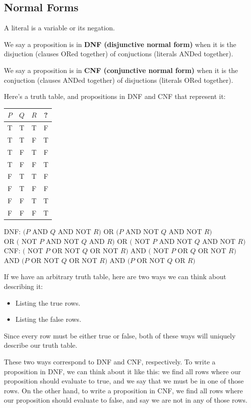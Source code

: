 \documentclass[12pt,letterpaper]{article}
\begin{document}
\subsection{Normal Forms}

A literal is a variable or its negation.

We say a proposition is in \textbf{DNF (disjunctive normal form)} when it is the disjuction (clauses ORed together) of conjuctions (literals ANDed together).
	
We say a proposition is in \textbf{CNF (conjunctive normal form)} when it is the conjuction (clauses ANDed together) of disjuctions (literals ORed together). 

Here's a truth table, and propositions in DNF and CNF that represent it:

\begin{tabular}{c|c|c|c}
     $P$ & $Q$ & $R$ & ?\\
    \hline
    T & T & T & F \\
    T & T & F & T \\
    T & F & T & F \\
    T & F & F & T \\
    F & T & T & F \\
    F & T & F & F \\
    F & F & T & T \\
    F & F & F & T
\end{tabular}

DNF: $(P$ AND $Q$ AND NOT $R)$ OR $(P$ AND NOT $Q$ AND NOT $R)$ \\
OR $($ NOT $P$ AND NOT $Q$ AND $R)$ OR $($ NOT $P$ AND NOT $Q$ AND NOT $R)$ \\
CNF: $($ NOT $P$ OR NOT $Q$ OR NOT $R)$ AND $($ NOT $P$ OR $Q$ OR NOT $R)$ \\
AND $(P$ OR NOT $Q$ OR NOT $R)$ AND $(P$ OR NOT $Q$ OR $R)$

If we have an arbitrary truth table, here are two ways we can think about describing it:
\begin{itemize}
    \item Listing the true rows.
    \item Listing the false rows.
\end{itemize}
Since every row must be either true or false, both of these ways will uniquely describe our truth table.

These two ways correspond to DNF and CNF, respectively. To write a proposition in DNF, we can think about it like this: we find all rows where our proposition should evaluate to true, and we say that we must be in one of those rows. On the other hand, to write a proposition in CNF, we find all rows where our proposition should evaluate to false, and say we are not in any of those rows.
\end{document}
